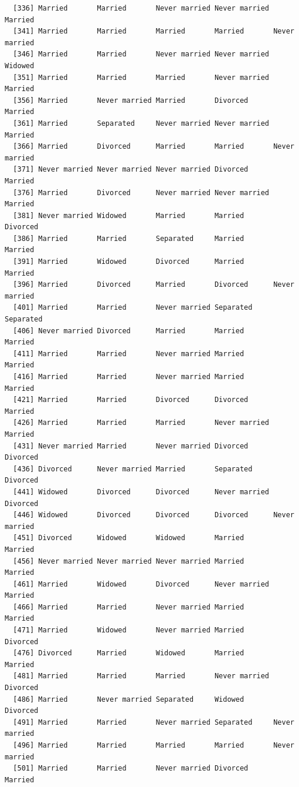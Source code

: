 \documentclass[
  letterpaper,
  DIV=11,
  numbers=noendperiod,
  oneside]{scrartcl}
\begin{document}
\begin{verbatim}
  [336] Married       Married       Never married Never married Married      
  [341] Married       Married       Married       Married       Never married
  [346] Married       Married       Never married Never married Widowed      
  [351] Married       Married       Married       Never married Married      
  [356] Married       Never married Married       Divorced      Married      
  [361] Married       Separated     Never married Never married Married      
  [366] Married       Divorced      Married       Married       Never married
  [371] Never married Never married Never married Divorced      Married      
  [376] Married       Divorced      Never married Never married Married      
  [381] Never married Widowed       Married       Married       Divorced     
  [386] Married       Married       Separated     Married       Married      
  [391] Married       Widowed       Divorced      Married       Married      
  [396] Married       Divorced      Married       Divorced      Never married
  [401] Married       Married       Never married Separated     Separated    
  [406] Never married Divorced      Married       Married       Married      
  [411] Married       Married       Never married Married       Married      
  [416] Married       Married       Never married Married       Married      
  [421] Married       Married       Divorced      Divorced      Married      
  [426] Married       Married       Married       Never married Married      
  [431] Never married Married       Never married Divorced      Divorced     
  [436] Divorced      Never married Married       Separated     Divorced     
  [441] Widowed       Divorced      Divorced      Never married Divorced     
  [446] Widowed       Divorced      Divorced      Divorced      Never married
  [451] Divorced      Widowed       Widowed       Married       Married      
  [456] Never married Never married Never married Married       Married      
  [461] Married       Widowed       Divorced      Never married Married      
  [466] Married       Married       Never married Married       Married      
  [471] Married       Widowed       Never married Married       Divorced     
  [476] Divorced      Married       Widowed       Married       Married      
  [481] Married       Married       Married       Never married Divorced     
  [486] Married       Never married Separated     Widowed       Divorced     
  [491] Married       Married       Never married Separated     Never married
  [496] Married       Married       Married       Married       Never married
  [501] Married       Married       Never married Divorced      Married      

\end{verbatim}
\end{document}
